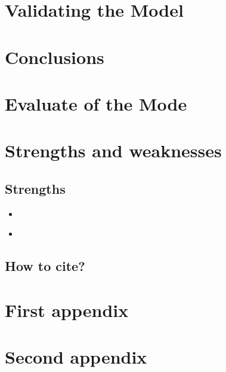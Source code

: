 \documentclass{mcmthesis}
\begin{document}
\section{Validating the Model}


\section{Conclusions}




\section{Evaluate of the Mode}

\section{Strengths and weaknesses}


\subsection{Strengths}
\begin{itemize}
\item \textbf{}\\

\item \textbf{}\\

\end{itemize}

\subsection{How to cite?}


\begin{thebibliography}{99}

\end{thebibliography}

\begin{appendices}

\section{First appendix}



\section{Second appendix}



\end{appendices}


\AImatter

\begin{ReportAiUse}{9}

\end{ReportAiUse}
\end{document}

